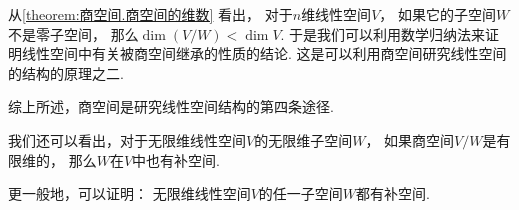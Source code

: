从\cref{theorem:商空间.商空间的维数} 看出，
对于\(n\)维线性空间\(V\)，
如果它的子空间\(W\)不是零子空间，
那么\(\dim(V/W) < \dim V\).
于是我们可以利用数学归纳法来证明线性空间中有关被商空间继承的性质的结论.
这是可以利用商空间研究线性空间的结构的原理之二.

综上所述，商空间是研究线性空间结构的第四条途径.

我们还可以看出，对于无限维线性空间\(V\)的无限维子空间\(W\)，
如果商空间\(V/W\)是有限维的，
那么\(W\)在\(V\)中也有补空间.

更一般地，可以证明：
无限维线性空间\(V\)的任一子空间\(W\)都有补空间.
